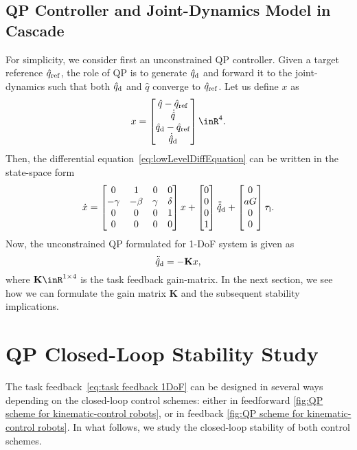 \subsection{QP Controller and Joint-Dynamics Model in Cascade}
For simplicity, we consider first an unconstrained QP controller. Given a target reference $\hat{q}_{\rm ref}$, the role of QP is to generate $\hat{q}_{\rm d}$ and forward it to the joint-dynamics such that both $\hat{q}_{\rm d}$ and $\hat{q}$ converge to $\hat{q}_{\rm ref}$. 
Let us define $x$ as 
\begin{equation}
	x = \begin{bmatrix}
		\hat{q} - \hat{q}_{\rm ref} \\ 
		\dot{\hat{q}}  \\
		\hat{q}_{\rm d} - \hat{q}_{\rm ref} \\
		\dot{\hat{q}}_{\rm d}  
	\end{bmatrix}\inR^4.
\end{equation}
 Then, the differential equation~\eqref{eq:lowLevelDiffEquation} can be written in the state-space form 
\begin{equation}\label{eq:lowLevelSSEquation}
	\dot{x} = \begin{bmatrix}
		0 & 1 & 0 & 0 \\
		-\gamma & -\beta & \gamma & \delta \\ 
		0 & 0 & 0 & 1 \\ 
		0 & 0 & 0 & 0 
	\end{bmatrix}x + 
	\begin{bmatrix}
		0 \\ 0 \\ 0 \\ 1
	\end{bmatrix}\ddot{\hat{q}}_{\rm d} + 
	\begin{bmatrix}
		0 \\ aG \\ 0 \\ 0
	\end{bmatrix}\tau_{\rm l}.
\end{equation}
Now, the unconstrained QP formulated for 1-DoF system is given as 
\begin{equation}\label{eq:task feedback 1DoF}
	\ddot{\hat{q}}_{\rm d} = - \mathbf{K}x, 
\end{equation}
where $\mathbf{K}\inR^{1\times 4}$ is the task feedback gain-matrix. In the next section, we see how we can formulate the gain matrix $\mathbf{K}$ and the subsequent stability implications.
\section{QP Closed-Loop Stability Study}\label{sec-chap2:QP stability investigation}
 The task feedback~\eqref{eq:task feedback 1DoF} can be designed in several ways depending on the closed-loop control schemes: either in feedforward \cref{fig:QP scheme for kinematic-control robots}, or in feedback \cref{fig:QP scheme for kinematic-control robots}. In what follows, we study the closed-loop stability of both control schemes. 
